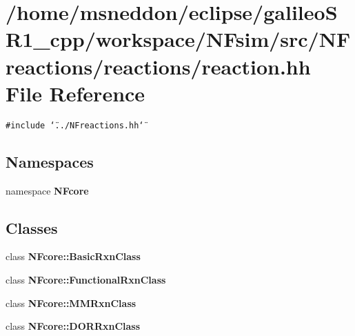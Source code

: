 \section{/home/msneddon/eclipse/galileoSR1\_\-cpp/workspace/NFsim/src/NFreactions/reactions/reaction.hh File Reference}
\label{reaction_8hh}


{\tt \#include \char`\"{}../NFreactions.hh\char`\"{}}\par
\subsection*{Namespaces}
\begin{CompactItemize}
\item 
namespace {\bf NFcore}
\end{CompactItemize}
\subsection*{Classes}
\begin{CompactItemize}
\item 
class {\bf NFcore::BasicRxnClass}
\item 
class {\bf NFcore::FunctionalRxnClass}
\item 
class {\bf NFcore::MMRxnClass}
\item 
class {\bf NFcore::DORRxnClass}
\end{CompactItemize}
